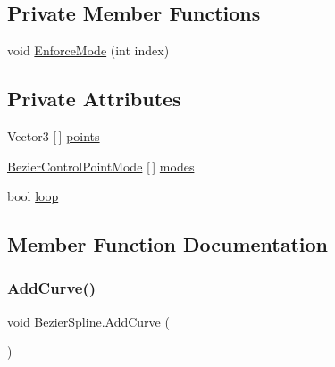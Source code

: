 \subsection*{Private Member Functions}
\begin{DoxyCompactItemize}
\item 
void \hyperlink{classBezierSpline_a9ce5f77aeb9b671034ce0845f8539166}{Enforce\+Mode} (int index)
\end{DoxyCompactItemize}
\subsection*{Private Attributes}
\begin{DoxyCompactItemize}
\item 
Vector3 \mbox{[}$\,$\mbox{]} \hyperlink{classBezierSpline_adda54d62157465856c511f0b94fd78d9}{points}
\item 
\hyperlink{BezierControlPointMode_8cs_a41ff1a7271616f36cab397d937ee41b0}{Bezier\+Control\+Point\+Mode} \mbox{[}$\,$\mbox{]} \hyperlink{classBezierSpline_affe3fe5b3977dfedf13f40e433363010}{modes}
\item 
bool \hyperlink{classBezierSpline_a819d3c15ebc913ed8da39daa07fd89a7}{loop}
\end{DoxyCompactItemize}


\subsection{Member Function Documentation}
\mbox{\label{classBezierSpline_a4676e1c6d2cfc8454c028e30d54783bd}} 
\subsubsection{\texorpdfstring{Add\+Curve()}{AddCurve()}}
{\footnotesize\ttfamily void Bezier\+Spline.\+Add\+Curve (\begin{DoxyParamCaption}{ }\end{DoxyParamCaption})\hspace{0.3cm}{\ttfamily [inline]}}

\mbox{\label{classBezierSpline_a9ce5f77aeb9b671034ce0845f8539166}} 
